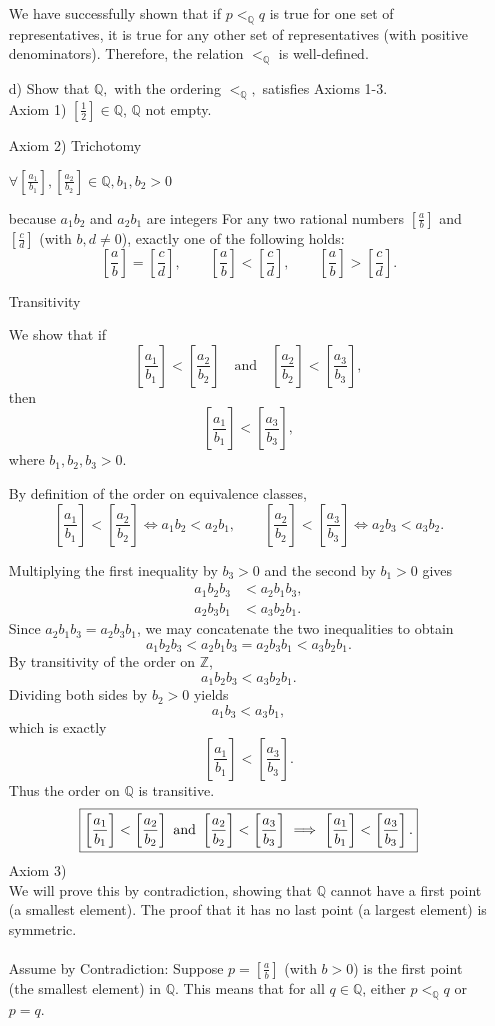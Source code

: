 \documentclass[11pt]{article}
\begin{document}
\begin{enumerate}
    \noindent
    We have successfully shown that if $p <_{\mathbb{Q}} q$ is true for one set of representatives, it is true for any other set of representatives (with positive denominators). Therefore, the relation $<_{\mathbb{Q}}$ is well-defined.
\item[d)] Show that $\mathbb{Q},$ with the ordering $<_{\mathbb{Q}},$ satisfies Axioms 1-3.
\\Axiom 1) $\left[\frac{1}{2}\right] \in \mathbb{Q}$, $\mathbb{Q}$ not empty.

Axiom 2) Trichotomy

$\forall \left[\frac{a_1}{b_1}\right], \left[\frac{a_2}{b_2}\right] \in \mathbb{Q}, b_1, b_2 > 0$

because $a_1 b_2$ and $a_2 b_1$ are integers
For any two rational numbers $\left[\frac{a}{b}\right]$ and $\left[\frac{c}{d}\right]$ (with $b,d \neq 0$), exactly one of the following holds:
\[
\left[\frac{a}{b}\right] = \left[\frac{c}{d}\right], \qquad
\left[\frac{a}{b}\right] < \left[\frac{c}{d}\right], \qquad
\left[\frac{a}{b}\right] > \left[\frac{c}{d}\right].
\]

Transitivity

We show that if
\[
\left[\frac{a_1}{b_1}\right] < \left[\frac{a_2}{b_2}\right]
\quad\text{and}\quad
\left[\frac{a_2}{b_2}\right] < \left[\frac{a_3}{b_3}\right],
\]
then
\[
\left[\frac{a_1}{b_1}\right] < \left[\frac{a_3}{b_3}\right],
\]
where \(b_1,b_2,b_3>0\).

By definition of the order on equivalence classes,
\[
\left[\frac{a_1}{b_1}\right] < \left[\frac{a_2}{b_2}\right]
\iff a_1 b_2 < a_2 b_1,
\qquad
\left[\frac{a_2}{b_2}\right] < \left[\frac{a_3}{b_3}\right]
\iff a_2 b_3 < a_3 b_2.
\]

Multiplying the first inequality by \(b_3>0\) and the second by \(b_1>0\) gives
\begin{align*}
a_1 b_2 b_3 &< a_2 b_1 b_3,\\[4pt]
a_2 b_3 b_1 &< a_3 b_2 b_1.
\end{align*}
Since \(a_2 b_1 b_3 = a_2 b_3 b_1\), we may concatenate the two inequalities to obtain
\[
a_1 b_2 b_3 < a_2 b_1 b_3 = a_2 b_3 b_1 < a_3 b_2 b_1.
\]
By transitivity of the order on \(\mathbb{Z}\),
\[
a_1 b_2 b_3 < a_3 b_2 b_1.
\]
Dividing both sides by \(b_2>0\) yields
\[
a_1 b_3 < a_3 b_1,
\]
which is exactly
\[
\left[\frac{a_1}{b_1}\right] < \left[\frac{a_3}{b_3}\right].
\]
Thus the order on \(\mathbb{Q}\) is transitive.
\[
\boxed{%
\left[\frac{a_1}{b_1}\right] < \left[\frac{a_2}{b_2}\right]
\ \text{and}\ 
\left[\frac{a_2}{b_2}\right] < \left[\frac{a_3}{b_3}\right]
\ \Longrightarrow\
\left[\frac{a_1}{b_1}\right] < \left[\frac{a_3}{b_3}\right].
}
\]
Axiom 3)
\\We will prove this by contradiction, showing that $\mathbb{Q}$ cannot have a first point (a smallest element). The proof that it has no last point (a largest element) is symmetric.
\\
\\Assume by Contradiction: Suppose $p = \left[\frac{a}{b}\right]$ (with $b > 0$) is the first point (the smallest element) in $\mathbb{Q}$. This means that for all $q \in \mathbb{Q}$, either $p <_{\mathbb{Q}} q$ or $p = q$.
        

\end{enumerate}
\end{document}
